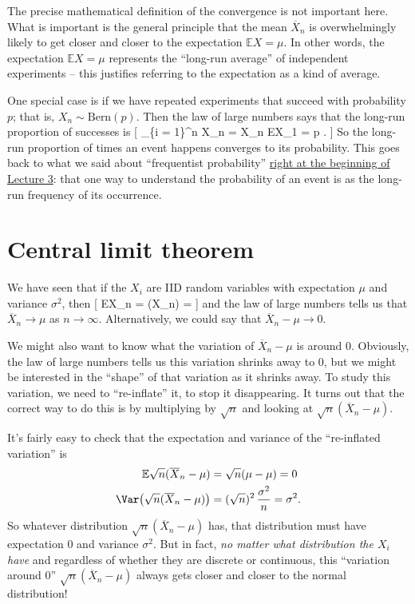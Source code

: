 \documentclass[
  letterpaper,
  DIV=11,
  numbers=noendperiod]{scrreprt}
\theoremstyle{remark}
\begin{document}
The precise mathematical definition of the convergence is not important
here. What is important is the general principle that the mean
\(\overline X_n\) is overwhelmingly likely to get closer and closer to
the expectation \(\mathbb EX = \mu\). In other words, the expectation
\(\mathbb EX = \mu\) represents the ``long-run average'' of independent
experiments -- this justifies referring to the expectation as a kind of
average.

One special case is if we have repeated experiments that succeed with
probability \(p\); that is, \(X_n \sim \text{Bern}(p)\). Then the law of
large numbers says that the long-run proportion of successes is {[}
 \sum\_\{i = 1\}\^{}n X\_n = \overline X\_n \to \mathbb EX\_1
= p . {]} So the long-run proportion of times an event happens converges
to its probability. This goes back to what we said about ``frequentist
probability'' \protect\hyperlink{what-is-prob}{right at the beginning of
Lecture 3}: that one way to understand the probability of an event is as
the long-run frequency of its occurrence.

\hypertarget{clt}{%
\section{Central limit theorem}\label{clt}}

We have seen that if the \(X_i\) are IID random variables with
expectation \(\mu\) and variance \(\sigma^2\), then {[}
\mathbb E\overline X\_n = \mu \qquad \Var \big(\overline X\_n\big) =
 {]} and the law of large numbers tells us that
\(\overline X_n \to \mu\) as \(n \to \infty\). Alternatively, we could
say that \(\overline X_n - \mu \to 0\).

We might also want to know what the variation of \(\overline X_n - \mu\)
is around 0. Obviously, the law of large numbers tells us this variation
shrinks away to 0, but we might be interested in the ``shape'' of that
variation as it shrinks away. To study this variation, we need to
``re-inflate'' it, to stop it disappearing. It turns out that the
correct way to do this is by multiplying by \(\sqrt{n}\) and looking at
\(\sqrt{n}(\overline X_n - \mu)\).

It's fairly easy to check that the expectation and variance of the
``re-inflated variation'' is \begin{align*}
\mathbb E\sqrt{n} (\overline X_n - \mu) &= \sqrt{n}(\mu - \mu) = 0 \\
\Var\big(\sqrt{n} (\overline X_n - \mu)\big) &= (\sqrt n)^2 \, \frac{\sigma^2}{n} = \sigma^2 . 
\end{align*} So whatever distribution \(\sqrt{n}(\overline X_n - \mu)\)
has, that distribution must have expectation \(0\) and variance
\(\sigma^2\). But in fact, \emph{no matter what distribution the \(X_i\)
have} and regardless of whether they are discrete or continuous, this
``variation around 0'' \(\sqrt{n}(\overline X_n - \mu)\) always gets
closer and closer to the normal distribution!
\end{document}
